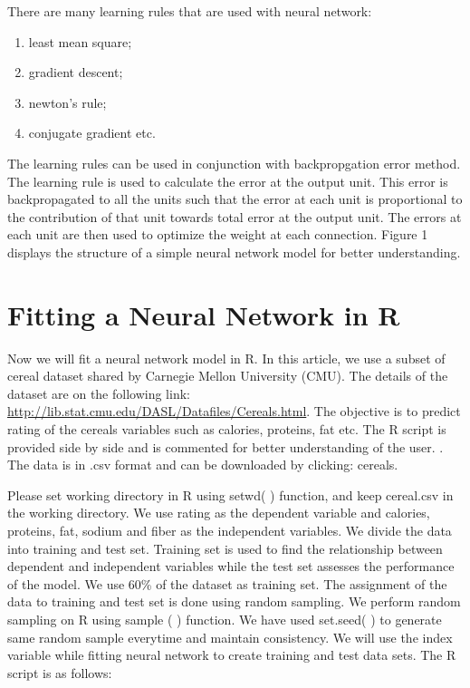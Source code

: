 \documentclass[]{book}
\providecommand{\tightlist}{%
  \setlength{\itemsep}{0pt}\setlength{\parskip}{0pt}}
\begin{document}
There are many learning rules that are used with neural network:

\begin{enumerate}
\def\labelenumi{\alph{enumi})}
\tightlist
\item
  least mean square;
\item
  gradient descent;
\item
  newton's rule;
\item
  conjugate gradient etc.
\end{enumerate}

The learning rules can be used in conjunction with backpropgation error method. The learning rule is used to calculate the error at the output unit. This error is backpropagated to all the units such that the error at each unit is proportional to the contribution of that unit towards total error at the output unit. The errors at each unit are then used to optimize the weight at each connection. Figure 1 displays the structure of a simple neural network model for better understanding.

\hypertarget{fitting-a-neural-network-in-r}{%
\section{Fitting a Neural Network in R}\label{fitting-a-neural-network-in-r}}

Now we will fit a neural network model in R. In this article, we use a subset of cereal dataset shared by Carnegie Mellon University (CMU). The details of the dataset are on the following link: \url{http://lib.stat.cmu.edu/DASL/Datafiles/Cereals.html}. The objective is to predict rating of the cereals variables such as calories, proteins, fat etc. The R script is provided side by side and is commented for better understanding of the user. . The data is in .csv format and can be downloaded by clicking: cereals.

Please set working directory in R using setwd( ) function, and keep cereal.csv in the working directory. We use rating as the dependent variable and calories, proteins, fat, sodium and fiber as the independent variables. We divide the data into training and test set. Training set is used to find the relationship between dependent and independent variables while the test set assesses the performance of the model. We use 60\% of the dataset as training set. The assignment of the data to training and test set is done using random sampling. We perform random sampling on R using sample ( ) function. We have used set.seed( ) to generate same random sample everytime and maintain consistency. We will use the index variable while fitting neural network to create training and test data sets. The R script is as follows:
\end{document}
